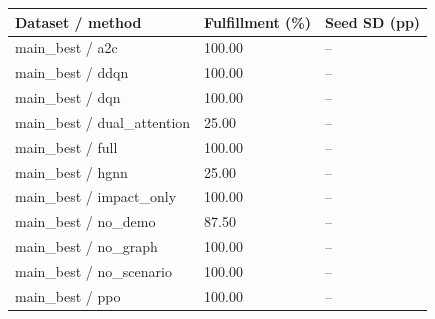 \begin{tabular}{lll}
\toprule
Dataset / method & Fulfillment (\%) & Seed SD (pp)\\
\midrule
main\_best / a2c & 100.00 & --\\
main\_best / ddqn & 100.00 & --\\
main\_best / dqn & 100.00 & --\\
main\_best / dual\_attention & 25.00 & --\\
main\_best / full & 100.00 & --\\
main\_best / hgnn & 25.00 & --\\
main\_best / impact\_only & 100.00 & --\\
main\_best / no\_demo & 87.50 & --\\
main\_best / no\_graph & 100.00 & --\\
main\_best / no\_scenario & 100.00 & --\\
main\_best / ppo & 100.00 & --\\
\bottomrule
\end{tabular}